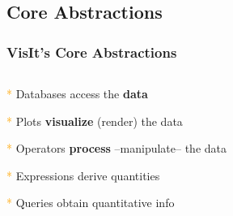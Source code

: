 \subsection{Core Abstractions}
\begin{frame}
\frametitle{VisIt's Core Abstractions}
\begin{columns}
\begin{column}{5cm}
	\begin{beamerboxesrounded}{\textcolor{orange}{*} Databases}
		access the \textbf{data}
	\end{beamerboxesrounded}

	\begin{beamerboxesrounded}{\textcolor{orange}{*} Plots}
		\textbf{visualize} (render) the data
	\end{beamerboxesrounded}

	\begin{beamerboxesrounded}{\textcolor{orange}{*} Operators}
		\textbf{process} --manipulate-- the data
	\end{beamerboxesrounded}

	\begin{beamerboxesrounded}{\textcolor{orange}{*} Expressions}
		derive quantities
	\end{beamerboxesrounded}

	\begin{beamerboxesrounded}{\textcolor{orange}{*} Queries}
		obtain quantitative info
	\end{beamerboxesrounded}
\end{column}
\begin{column}{5cm}
\end{column}
\end{columns}
\end{frame}




